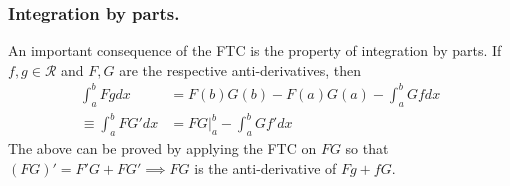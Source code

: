 \subsubsection{Integration by parts.}
An important consequence of the FTC is the property of integration by parts.
If $f,g\in\mathcal{R}$ and $F,G$ are the respective anti-derivatives, then
\begin{equation*}
\begin{split}
\int^b_aFgdx &= F(b)G(b)-F(a)G(a)-\int^b_aGfdx\\
\equiv \int^b_a FG' dx &= FG\Big\rvert^b_a - \int^b_a Gf' dx
\end{split}
\end{equation*}
The above can be proved by applying the FTC on $FG$ so that $(FG)'=F'G + FG'\implies FG$ is the anti-derivative of $Fg+fG$.